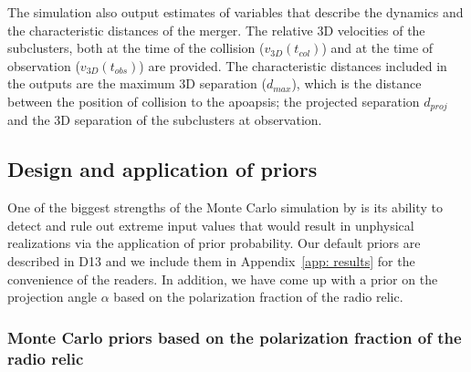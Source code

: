 The simulation also output estimates of variables that describe
the dynamics and the characteristic distances of the merger. The relative
3D velocities of the subclusters, both at the time of the
collision ($v_{3D}(t_{col})$) and at the time of observation
($v_{3D}(t_{obs})$) are provided. The characteristic
distances included in the outputs are the maximum 3D separation ($d_{max}$),
which is the distance between the position of collision to
the apoapsis; the projected separation $d_{proj}$ and the 3D separation of the subclusters at observation. 
\subsection{Design and application of priors} 
\label{sec:priors}
%
One of the biggest strengths of the Monte Carlo simulation by  is its ability
to detect and rule out extreme input values that would result in
unphysical realizations via the application of prior probability. 
Our default priors are described in D13 and we include them in Appendix~\ref{app: results} for the convenience of the readers. 
In addition, we have come up with a prior on the projection angle $\alpha$
based on the polarization fraction of the radio relic.

\subsubsection{Monte Carlo priors based on the polarization fraction of the radio relic}
%

